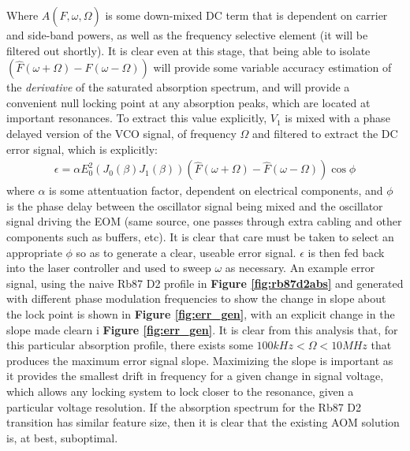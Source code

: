 Where  $A(\hat{F}, \omega, \Omega)$ is some down-mixed DC term that is dependent
on carrier and side-band powers, as well as the frequency selective element
(it will be filtered out shortly). It is clear even at this stage, that being
able to isolate $(\hat{F}(\omega + \Omega) - \hat{F}(\omega - \Omega))$ will
provide some variable accuracy estimation of the \emph{derivative} of the
saturated absorption spectrum, and will provide a convenient null locking point
at any absorption peaks, which are located at important resonances. To extract
this value explicitly, $V_1$ is mixed with a phase delayed version of the
VCO signal, of frequency $\Omega$ and filtered to extract the DC error signal,
which is explicitly:
\begin{gather}\label{eq:err_sig}
  \epsilon = \alpha E_0^2 (J_0(\beta)J_1(\beta))
    (\hat{F}(\omega + \Omega) - \hat{F}(\omega - \Omega))\cos\phi
\end{gather}
where $\alpha$ is some attentuation factor, dependent on electrical components,
and $\phi$ is the phase delay between the oscillator signal being mixed
and the oscillator signal driving the EOM (same source, one passes through
extra cabling and other components such as buffers, etc). It is clear that
care must be taken to select an appropriate $\phi$ so as to generate a
clear, useable error signal. $\epsilon$ is then fed back into the
laser controller and used to sweep $\omega$ as necessary.
An example error signal, using the naive Rb87 D2 profile in
\textbf{Figure \ref{fig:rb87d2abs}} and generated with different phase modulation
frequencies to show the change in slope about the lock point is shown in
\textbf{Figure \ref{fig:err_gen}}, with an explicit
change in the slope made clearn i
\textbf{Figure  \ref{fig:err_gen}}. It is clear from
this analysis that, for this particular absorption profile,
there exists some $ 100kHz < \Omega < 10MHz $ that produces
the maximum error signal slope. Maximizing the slope is important as it provides
the smallest drift in frequency for a given change in signal voltage, which
allows any locking system to lock closer to the resonance, given a particular
voltage resolution. If the absorption spectrum for the Rb87 D2 transition has
similar feature size, then it is clear that the existing AOM solution is,
at best, suboptimal.

